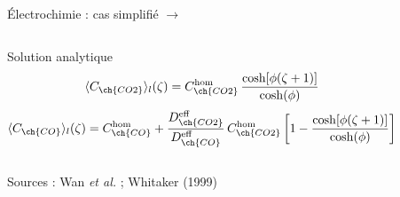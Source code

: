 \begin{frame}[t]{Électrochimie : cas simplifié  $\rightarrow$ }
\begin{columns}[T,onlytextwidth]
      \begin{pcbanner}{Solution analytique}
        \vspace{-0.5em}
        \centering\scriptsize
        \[ \langle C_{\ch{CO2}}\rangle_l(\zeta)
           = C^{\mathrm{hom}}_{\ch{CO2}}\,
             \frac{\cosh[\phi(\zeta+1)]}{\cosh(\phi)} \]
        \[ \langle C_{\ch{CO}}\rangle_l(\zeta)
           = C^{\mathrm{hom}}_{\ch{CO}}
           + \frac{D^{\mathrm{eff}}_{\ch{CO2}}}{D^{\mathrm{eff}}_{\ch{CO}}}
             \,C^{\mathrm{hom}}_{\ch{CO2}}
             \left[1 - \frac{\cosh[\phi(\zeta+1)]}{\cosh(\phi)}\right] \]
      \end{pcbanner}

    \end{columns}
      {\tiny\color{pcNavy!60} Sources : Wan \textit{et al.} ; Whitaker (1999)}
\end{frame}